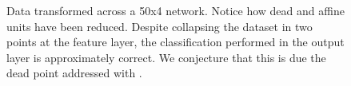 \begin{figure}
{{    %
    }
    \parbox{.195\textwidth}{%
    }
  }
  \caption{Data transformed across a 50x4 \SepUnit network. Notice how dead and affine units have been reduced. Despite collapsing the dataset in two points at the feature layer, the classification performed in the output layer is approximately correct. We conjecture that this is due the dead point addressed with \SepPoint.}
    \label{fig:moonsUnitwise}
\end{figure}



